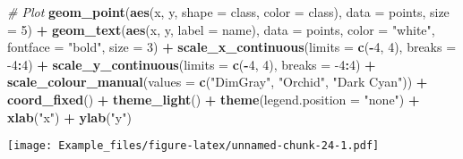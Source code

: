 \documentclass[]{article}
\newenvironment{Shaded}{\begin{snugshade}}{\end{snugshade}}
\newcommand{\CommentTok}[1]{\textcolor[rgb]{0.56,0.35,0.01}{\textit{#1}}}
\newcommand{\DataTypeTok}[1]{\textcolor[rgb]{0.13,0.29,0.53}{#1}}
\newcommand{\DecValTok}[1]{\textcolor[rgb]{0.00,0.00,0.81}{#1}}
\newcommand{\KeywordTok}[1]{\textcolor[rgb]{0.13,0.29,0.53}{\textbf{#1}}}
\newcommand{\NormalTok}[1]{#1}
\newcommand{\OperatorTok}[1]{\textcolor[rgb]{0.81,0.36,0.00}{\textbf{#1}}}
\newcommand{\StringTok}[1]{\textcolor[rgb]{0.31,0.60,0.02}{#1}}
\begin{document}
\begin{Shaded}
\begin{Highlighting}[]
\StringTok{  }\CommentTok{# Plot}
\StringTok{  }\KeywordTok{geom_point}\NormalTok{(}\KeywordTok{aes}\NormalTok{(x, y, }\DataTypeTok{shape =}\NormalTok{ class, }\DataTypeTok{color =}\NormalTok{ class), }\DataTypeTok{data =}\NormalTok{ points, }\DataTypeTok{size =} \DecValTok{5}\NormalTok{) }\OperatorTok{+}
\StringTok{  }\KeywordTok{geom_text}\NormalTok{(}\KeywordTok{aes}\NormalTok{(x, y, }\DataTypeTok{label =}\NormalTok{ name), }\DataTypeTok{data =}\NormalTok{ points, }\DataTypeTok{color =} \StringTok{"white"}\NormalTok{, }\DataTypeTok{fontface =} \StringTok{"bold"}\NormalTok{, }\DataTypeTok{size =} \DecValTok{3}\NormalTok{) }\OperatorTok{+}
\StringTok{  }
\StringTok{   }\KeywordTok{scale_x_continuous}\NormalTok{(}\DataTypeTok{limits =} \KeywordTok{c}\NormalTok{(}\OperatorTok{-}\DecValTok{4}\NormalTok{, }\DecValTok{4}\NormalTok{), }\DataTypeTok{breaks =} \DecValTok{-4}\OperatorTok{:}\DecValTok{4}\NormalTok{) }\OperatorTok{+}
\StringTok{  }\KeywordTok{scale_y_continuous}\NormalTok{(}\DataTypeTok{limits =} \KeywordTok{c}\NormalTok{(}\OperatorTok{-}\DecValTok{4}\NormalTok{, }\DecValTok{4}\NormalTok{), }\DataTypeTok{breaks =} \DecValTok{-4}\OperatorTok{:}\DecValTok{4}\NormalTok{) }\OperatorTok{+}
\StringTok{  }\KeywordTok{scale_colour_manual}\NormalTok{(}\DataTypeTok{values =} \KeywordTok{c}\NormalTok{(}\StringTok{"DimGray"}\NormalTok{, }\StringTok{"Orchid"}\NormalTok{, }\StringTok{"Dark Cyan"}\NormalTok{)) }\OperatorTok{+}
\StringTok{  }\KeywordTok{coord_fixed}\NormalTok{() }\OperatorTok{+}
\StringTok{  }
\StringTok{  }\KeywordTok{theme_light}\NormalTok{() }\OperatorTok{+}
\StringTok{  }\KeywordTok{theme}\NormalTok{(}\DataTypeTok{legend.position =} \StringTok{"none"}\NormalTok{) }\OperatorTok{+}
\StringTok{  }\KeywordTok{xlab}\NormalTok{(}\StringTok{"x"}\NormalTok{) }\OperatorTok{+}
\StringTok{  }\KeywordTok{ylab}\NormalTok{(}\StringTok{"y"}\NormalTok{)}
\end{Highlighting}
\end{Shaded}

\texttt{[image: Example\_files/figure-latex/unnamed-chunk-24-1.pdf]}
\end{document}
